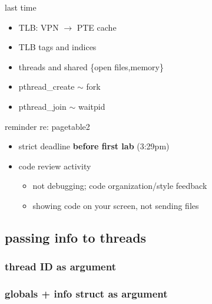 \date{}
\title{}
\date{}

\begin{frame}
    \titlepage
\end{frame}

\begin{frame}{last time}
    \begin{itemize}
    \item TLB: VPN $\rightarrow$ PTE cache
    \item TLB tags and indices
    \vspace{.5cm}
    \item threads and shared \{open files,memory\}
    \item pthread\_create $\sim$ fork
    \item pthread\_join $\sim$ waitpid
    \end{itemize}
\end{frame}

\begin{frame}{reminder re: pagetable2}
    \begin{itemize}
    \item strict deadline \textbf{before first lab} (3:29pm)
    \item code review activity
        \begin{itemize}
        \item not debugging; code organization/style feedback
        \item showing code on your screen, not sending files
        \end{itemize}
    \end{itemize}
\end{frame}






\subsection{passing info to threads}

\subsubsection{thread ID as argument}


\subsubsection{globals + info struct as argument}



